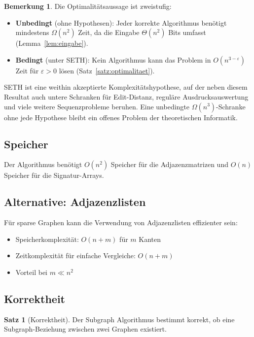 \documentclass[a4paper,12pt]{article}
\theoremstyle{definition}
\newtheorem{satz}{Satz}
\newtheorem{bemerkung}{Bemerkung}
\begin{document}
\begin{bemerkung}
Die Optimalitätsaussage ist zweistufig:
\begin{itemize}
	\item \textbf{Unbedingt} (ohne Hypothesen): Jeder korrekte Algorithmus benötigt mindestens
	      $\Omega(n^2)$ Zeit, da die Eingabe $\Theta(n^2)$ Bits umfasst (Lemma~\ref{lem:eingabe}).
	\item \textbf{Bedingt} (unter SETH): Kein Algorithmus kann das Problem in $O(n^{3-\varepsilon})$
	      Zeit für $\varepsilon > 0$ lösen (Satz~\ref{satz:optimalitaet}).
\end{itemize}
SETH ist eine weithin akzeptierte Komplexitätshypothese, auf der neben diesem Resultat auch
untere Schranken für Edit-Distanz, reguläre Ausdrucksauswertung und viele weitere Sequenzprobleme
beruhen. Eine unbedingte $\Omega(n^3)$-Schranke ohne jede Hypothese bleibt ein offenes Problem
der theoretischen Informatik.
\end{bemerkung}

\subsection{Speicher}

Der Algorithmus benötigt $O(n^2)$ Speicher für die Adjazenzmatrizen und $O(n)$ Speicher für die Signatur-Arrays.

\subsection{Alternative: Adjazenzlisten}

Für sparse Graphen kann die Verwendung von Adjazenzlisten effizienter sein:

\begin{itemize}
	\item Speicherkomplexität: $O(n + m)$ für $m$ Kanten
	\item Zeitkomplexität für einfache Vergleiche: $O(n + m)$
	\item Vorteil bei $m \ll n^2$
\end{itemize}

\subsection{Korrektheit}

\begin{satz}[Korrektheit]
	Der Subgraph Algorithmus bestimmt korrekt, ob eine Subgraph-Beziehung zwischen zwei Graphen existiert.
\end{satz}
\end{document}
